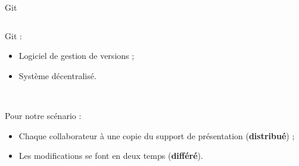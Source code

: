 \begin{frame}{Git}
\begin{columns}
  \begin{column}{.55\textwidth}
  Git :
  \begin{itemize}
    \item Logiciel de gestion de versions ;
    \item Système décentralisé.
  \end{itemize}~

  Pour notre scénario :
  \begin{itemize}
    \item Chaque collaborateur à une copie du support de présentation
    (\textbf{distribué}) ;
    \item Les modifications se font en deux temps (\textbf{différé}).
  \end{itemize}
  \end{column}


\end{columns}
\end{frame}
